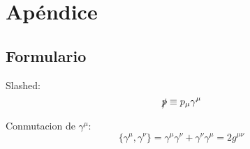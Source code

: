 
\appendix

\chapter{Apéndice}

\section{Formulario}
\begin{multicols}{2}

\begin{Formulario}
    Slashed: 
    \begin{equation*}
    \slashed{p} \equiv p_\mu \gamma^\mu
    \end{equation*}
\end{Formulario}
\begin{Formulario}
    Conmutacion de $\gamma^\mu$: 
    \begin{equation*}
    \{ \gamma^\mu, \gamma^\nu \} = \gamma^\mu \gamma^\nu + \gamma^\nu \gamma^\mu = 2 g^{\mu\nu} 
    \end{equation*}
\end{Formulario}
\end{multicols}
